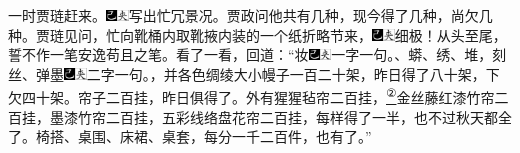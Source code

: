 一时贾琏赶来。{\includegraphics[width=3mm]{../Images/00003}\includegraphics[width=3mm]{../Images/00012}\footnotesize \kaishu 写出忙冗景况。}贾政问他共有几种，现今得了几种，尚欠几种。贾琏见问，忙向靴桶内取靴掖内装的一个纸折略节来，{\includegraphics[width=3mm]{../Images/00003}\includegraphics[width=3mm]{../Images/00012}\footnotesize \kaishu 细极！从头至尾，誓不作一笔安逸苟且之笔。}看了一看，回道：``妆{\includegraphics[width=3mm]{../Images/00003}\includegraphics[width=3mm]{../Images/00012}\footnotesize \kaishu 一字一句。}、蟒、绣、堆，刻丝、弹墨{\includegraphics[width=3mm]{../Images/00003}\includegraphics[width=3mm]{../Images/00012}\footnotesize \kaishu 二字一句。}，并各色绸绫大小幔子一百二十架，昨日得了八十架，下欠四十架。帘子二百挂，昨日俱得了。外有猩猩毡帘二百挂，\href{../Text/part0021_split_000.html\#lnkback_2_a}{\textsuperscript{②}}金丝藤红漆竹帘二百挂，墨漆竹帘二百挂，五彩线络盘花帘二百挂，每样得了一半，也不过秋天都全了。椅搭、桌围、床裙、桌套，每分一千二百件，也有了。''

